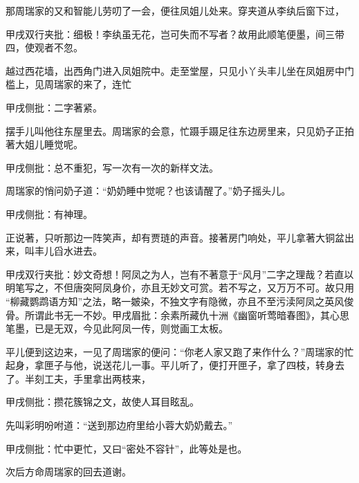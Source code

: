 \begin{parag}
    那周瑞家的又和智能儿劳叨了一会，便往凤姐儿处来。穿夹道从李纨后窗下过，\begin{note}甲戌双行夹批：细极！李纨虽无花，岂可失而不写者？故用此顺笔便墨，间三带四，使观者不忽。\end{note}越过西花墙，出西角门进入凤姐院中。走至堂屋，只见小丫头丰儿坐在凤姐房中门槛上，见周瑞家的来了，连忙\begin{note}甲戌侧批：二字著紧。\end{note}摆手儿叫他往东屋里去。周瑞家的会意，忙蹑手蹑足往东边房里来，只见奶子正拍著大姐儿睡觉呢。\begin{note}甲戌侧批：总不重犯，写一次有一次的新样文法。\end{note}周瑞家的悄问奶子道：“奶奶睡中觉呢？也该请醒了。”奶子摇头儿。\begin{note}甲戌侧批：有神理。\end{note}正说著，只听那边一阵笑声，却有贾琏的声音。接著房门响处，平儿拿著大铜盆出来，叫丰儿舀水进去。\begin{note}甲戌双行夹批：妙文奇想！阿凤之为人，岂有不著意于“风月”二字之理哉？若直以明笔写之，不但唐突阿凤身价，亦且无妙文可赏。若不写之，又万万不可。故只用 “柳藏鹦鹉语方知”之法，略一皴染，不独文字有隐微，亦且不至污渎阿凤之英风俊骨。所谓此书无一不妙。甲戌眉批：余素所藏仇十洲《幽窗听莺暗春图》，其心思笔墨，已是无双，今见此阿凤一传，则觉画工太板。\end{note}平儿便到这边来，一见了周瑞家的便问：“你老人家又跑了来作什么？”周瑞家的忙起身，拿匣子与他，说送花儿一事。平儿听了，便打开匣子，拿了四枝，转身去了。半刻工夫，手里拿出两枝来，\begin{note}甲戌侧批：攒花簇锦之文，故使人耳目眩乱。\end{note}先叫彩明吩咐道：“送到那边府里给小蓉大奶奶戴去。”\begin{note}甲戌侧批：忙中更忙，又曰“密处不容针”，此等处是也。\end{note}次后方命周瑞家的回去道谢。
\end{parag}


